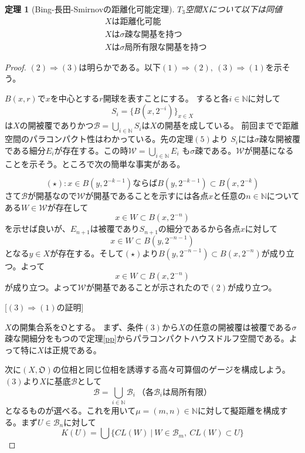 \documentclass[leqno]{jsarticle}
\newtheorem{thm}{定理}
\newcommand{\To}{\Longrightarrow}
\newcommand{\nn}{\mathbb{N}}
\newcommand{\dpst}{\displaystyle}
\begin{document}
\setcounter{equation}{0}
\begin{thm}[Bing-長田-Smirnovの距離化可能定理]
$T_3$空間$X$について以下は同値
\begin{align}
&\mbox{$X$は距離化可能}\\
&\mbox{$X$は$\sigma$疎な開基を持つ}\\
&\mbox{$X$は$\sigma$局所有限な開基を持つ}
\end{align}
\end{thm}
\begin{proof}
$(2)\To(3)$は明らかである。以下$(1)\To(2),\ (3)\To (1)$を示そう。\par
[$(1)\To (2)$の証明]\par
$B(x,r)$で$x$を中心とする$r$開球を表すことにする。
すると各$i\in \nn$に対して
\[
S_i=\{B(x,2^{-i})\}_{x\in X}
\]
は$X$の開被覆でありかつ$\dpst \mathcal{B}=\bigcup_{i\in \nn}S_i$は$X$の開基を成している。
前回までで距離空間のパラコンパクト性はわかっている。先の定理$(5)$より
$S_i$には$\sigma$疎な開被覆である細分$E_i$が存在する。この時$\mathcal{W}=\bigcup_{i\in \nn }E_i$
も$\sigma$疎である。$\mathcal{W}$が開基になることを示そう。ところで次の簡単な事実がある。\par
\[
(\star):\mbox{$x\in B(y,2^{-k-1})$ならば$B(y,2^{-k-1})\subset B(x,2^{-k})$}
\]
さて$\mathcal{B}$が開基なので$\mathcal{W}$が開基であることを示すには各点$x$と任意の$n\in \nn$についてある$W\in \mathcal{W}$が存在して
\[
x\in W\subset B(x,2^{-n})
\]
を示せば良いが、$E_{n+1}$は被覆であり$S_{n+1}$の細分であるから各点$x$に対して
\[
x\in W\subset B(y,2^{-n-1})
\]
となる$y\in X$が存在する。そして$(\star)$より$B(y,2^{-n-1})\subset B(x,2^{-n})$が成り立つ。よって
\[
x\in W\subset B(x,2^{-n})
\]
が成り立つ。よって$\mathcal{W}$が開基であることが示されたので$(2)$が成り立つ。
\par[$(1)\To (2)$の証明終わり]\par
[$(3)\To (1)$の証明]\par
$X$の開集合系を$\mathfrak{O}$とする。
まず、条件$(3)$から$X$の任意の開被覆は被覆である$\sigma$疎な開細分をもつので定理\ref{pp}からパラコンパクトハウスドルフ空間である。よって特に$X$は正規である。\par
次に$(X,\mathfrak{O})$の位相と同じ位相を誘導する高々可算個のゲージを構成しよう。$(3)$より$X$に基底$\mathcal{B}$として
\[
\mathcal{B}=\bigcup_{i\in \nn }\mathcal{B}_i\ \mbox{（各$\mathcal{B}_i$は局所有限）}
\]
となるものが選べる。これを用いて$\mu=(m,n)\in \nn$に対して擬距離を構成する。まず$U\in \mathcal{B}_n$に対して
\[
K(U)=\bigcup\{CL(W)\ |\ W\in \mathcal{B}_m,\ CL(W)\subset U\}
\]
\end{proof}
\end{document}
